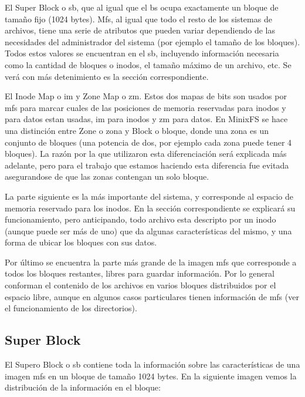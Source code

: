 El Super Block o sb, que al igual que el bs ocupa exactamente un bloque de
tamaño fijo (1024 bytes). Mfs, al igual que todo el resto de los sistemas de
archivos, tiene una serie de atributos que pueden variar dependiendo
de las necesidades del administrador del sistema (por ejemplo el tamaño de los
bloques). Todos estos valores se encuentran en el sb, incluyendo información
necesaria como la cantidad de bloques o inodos, el tamaño máximo de un archivo,
etc. Se verá con más detenimiento es la sección correspondiente.

El Inode Map o im y Zone Map o zm. Estos dos mapas de bits son usados por mfs
para marcar cuales de las posiciones de memoria reservadas para inodos y para
datos estan usadas, im para inodos y zm para datos. En MinixFS se
hace una distinción entre Zone o zona y Block o bloque, donde una zona es un
conjunto de bloques (una potencia de dos, por ejemplo cada zona puede tener 4
bloques). La razón por la que utilizaron esta diferenciación será explicada más
adelante, pero para el trabajo que estamos haciendo esta diferencia fue evitada
asegurandose de que las zonas contengan un solo bloque.

La parte siguiente es la más importante del sistema, y corresponde al espacio de
memoria reservado para los inodos. En la sección correspondiente se explicará su
funcionamiento, pero anticipando, todo archivo esta descripto por un inodo
(aunque puede ser más de uno) que da algunas características del mismo, y una
forma de ubicar los bloques con sus datos.

Por último se encuentra la parte más grande de la imagen mfs que corresponde a
todos los bloques restantes, libres para guardar información. Por lo general
conforman el contenido de los archivos en varios bloques distribuidos por el
espacio libre, aunque en algunos casos particulares tienen información de mfs
(ver el funcionamiento de los directorios).

\subsection{Super Block}

El Supero Block o sb contiene toda la información sobre las características de
una imagen mfs en un bloque de tamaño 1024 bytes. En la siguiente imagen vemos
la distribución de la información en el bloque:


